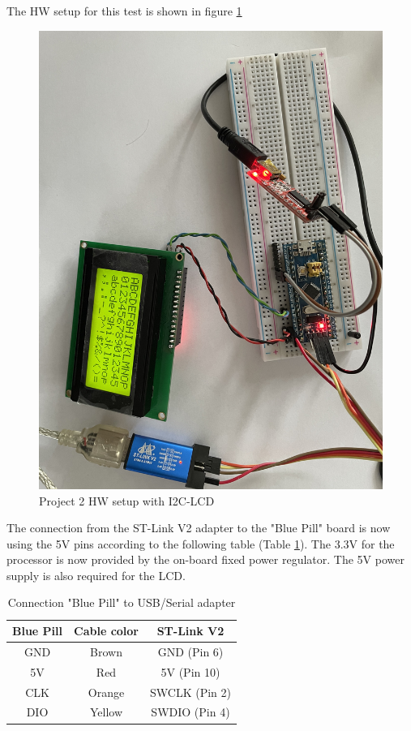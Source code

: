 \documentclass[11pt, oneside]{scrartcl}   	%
\begin{document}
The HW setup for this test is shown in figure \ref{fig:HWSetupI2CLCD}
\begin{figure}[htbp]
	\centering
	\includegraphics[width=1.0\linewidth]{Figures/Test_BluePill_I2C_LCD_HWSetup.jpeg}
	\caption{Project 2 HW setup with I2C-LCD}
	\label{fig:HWSetupI2CLCD}
\end{figure}
The connection from the ST-Link V2 adapter to the "Blue Pill" board is now using the 5V pins according to the following table
(Table \ref{table:ConnectionSTLink2}).
The 3.3V for the processor is now provided by the on-board fixed power regulator. The 5V power supply is also required for the LCD.
\begin{table}[htbp]
	\centering
	\begin{tabular}{|c|c|c|}
		\hline
		\textbf{Blue Pill} & \textbf{Cable color} & \textbf{ST-Link V2} \\
		\hline
		GND & Brown & GND (Pin 6) \\
		\hline
		5V & Red & 5V (Pin 10) \\
		\hline
		CLK & Orange & SWCLK (Pin 2) \\
		\hline
		DIO & Yellow & SWDIO (Pin 4) \\
		\hline
	\end{tabular}
\caption{Connection "Blue Pill" to USB/Serial adapter}
\label{table:ConnectionSTLink2}
\end{table}
\end{document}
